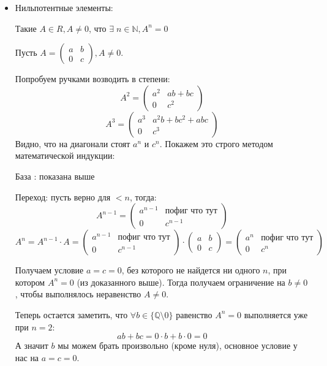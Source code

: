 \documentclass[a4paper,12pt]{article}
\begin{document}
\begin{itemize}
\clearpage
\item Нильпотентные элементы:

\begin{center}
Такие $A \in R, A \neq 0$, что $\exists \; n \in \mathbb{N}, A^n = 0$
\end{center}
Пусть $A = \begin{pmatrix}
a & b \\ 0 & c 
\end{pmatrix}, A \neq 0 $. 

Попробуем ручками возводить в степени:
\[
A^2 = \begin{pmatrix}
a^2 & ab + bc \\ 0 & c^2
\end{pmatrix}
\]
\[
A^3 = \begin{pmatrix}
a^3 & a^2 b + bc^2 + abc \\ 0 & c^3
\end{pmatrix}
\]
Видно, что на диагонали стоят $a^n$ и $c^n$. Покажем это строго методом математической индукции:

База : показана выше

Переход: пусть верно для $< n$, тогда:
\[
A^{n-1} = \begin{pmatrix}
a^{n - 1} & \text{пофиг что тут} \\
0 & c^{n - 1}
\end{pmatrix}
\]
\[
A^n = A^{n-1} \cdot A = \begin{pmatrix}
a^{n - 1} & \text{пофиг что тут} \\
0 & c^{n - 1}
\end{pmatrix} \cdot \begin{pmatrix}
a & b \\0 & c
\end{pmatrix} = \begin{pmatrix}
a^n & \text{пофиг что тут} \\ 0 & c^n
\end{pmatrix}
\]

Получаем условие $ a = c = 0$, без которого не найдется ни одного $n$, при котором $A^n = 0$ (из доказанного выше). Тогда получаем ограничение на $b \neq 0$, чтобы выполнялось неравенство $A \neq 0 $.

Теперь остается заметить, что $\forall b \in \{ \mathbb{Q} \setminus 0 \}$ равенство $A^n = 0$ выполняется уже при $n = 2$:
\[
ab + bc = 0 \cdot b + b \cdot 0 = 0 
\]
А значит $b$ мы можем брать произвольно (кроме нуля), основное условие у нас на $a = c  = 0$.
\end{itemize}
\end{document}
